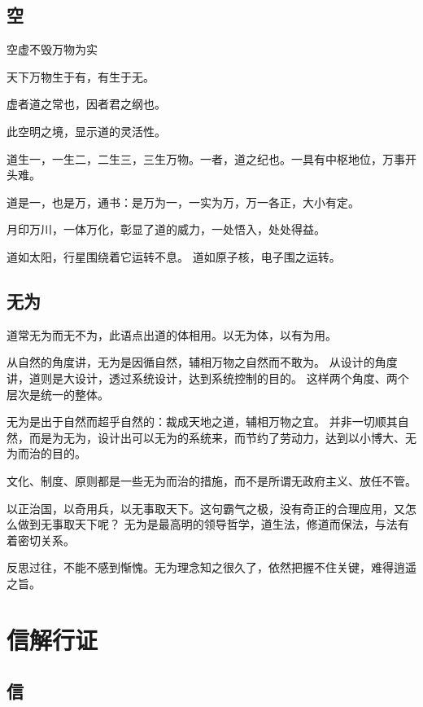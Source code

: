 \subsection{空}

\begin{enumbox}
\item 空虚不毁万物为实
\item 天下万物生于有，有生于无。
\item 虚者道之常也，因者君之纲也。
\end{enumbox}

此空明之境，显示道的灵活性。

道生一，一生二，二生三，三生万物。一者，道之纪也。一具有中枢地位，万事开头难。

道是一，也是万，通书：是万为一，一实为万，万一各正，大小有定。

月印万川，一体万化，彰显了道的威力，一处悟入，处处得益。

道如太阳，行星围绕着它运转不息。
道如原子核，电子围之运转。

\subsection{无为}

道常无为而无不为，此语点出道的体相用。以无为体，以有为用。

从自然的角度讲，无为是因循自然，辅相万物之自然而不敢为。
从设计的角度讲，道则是大设计，透过系统设计，达到系统控制的目的。
这样两个角度、两个层次是统一的整体。

无为是出于自然而超乎自然的：裁成天地之道，辅相万物之宜。
并非一切顺其自然，而是为无为，设计出可以无为的系统来，而节约了劳动力，达到以小博大、无为而治的目的。

文化、制度、原则都是一些无为而治的措施，而不是所谓无政府主义、放任不管。

以正治国，以奇用兵，以无事取天下。这句霸气之极，没有奇正的合理应用，又怎么做到无事取天下呢？
无为是最高明的领导哲学，道生法，修道而保法，与法有着密切关系。

反思过往，不能不感到惭愧。无为理念知之很久了，依然把握不住关键，难得逍遥之旨。

\section{信解行证}

\subsection{信}

